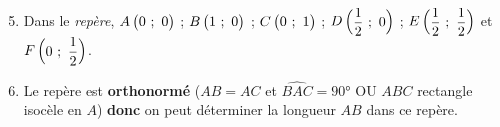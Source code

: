\newpage

\begin{minipage}{0.45\textwidth}
\thispagestyle{correction2}

\vspace*{1em}


\begin{enumerate}
	\setcounter{enumi}{4}
	\item Dans le \emph{repère}, $A\begin{pmatrix}0~;~0\end{pmatrix}$ ; $B\begin{pmatrix}1~;~0\end{pmatrix}$ ; $C\begin{pmatrix}0~;~1\end{pmatrix}$ ; $D\begin{pmatrix}\dfrac{1}{2}~;~0\end{pmatrix}$ ; $E\begin{pmatrix}\dfrac{1}{2}~;~\dfrac{1}{2}\end{pmatrix}$ et $F\begin{pmatrix}0~;~\dfrac{1}{2}\end{pmatrix}$.
	\item Le repère est \textbf{orthonormé} ($AB = AC$ et $\widehat{BAC} = 90°$ OU $ABC$ rectangle isocèle en $A$) \textbf{donc} on peut déterminer la longueur $AB$ dans ce repère.
\end{enumerate}


\vspace*{1em}
\centering
{}

\end{minipage}